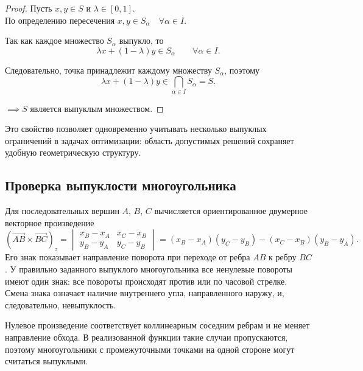 \begin{proof}
Пусть $x,y\in S$ и $\lambda\in[0,1]$.\\
По определению пересечения
$x,y\in S_\alpha \quad \forall \alpha\in I$.

Так как каждое множество $S_\alpha$ выпукло, то
\[
    \lambda x+(1-\lambda)y\in S_\alpha
    \qquad \forall \alpha\in I.
\]

Следовательно, точка принадлежит каждому множеству $S_\alpha$, поэтому
\[
    \lambda x+(1-\lambda)y
    \in \bigcap_{\alpha\in I} S_\alpha
    = S.
\]

$\implies S$ является выпуклым множеством.
\end{proof}

Это свойство позволяет одновременно учитывать несколько выпуклых ограничений в задачах оптимизации: область допустимых решений сохраняет удобную геометрическую структуру.

\subsection{Проверка выпуклости многоугольника}

Для последовательных вершин $A$, $B$, $C$ вычисляется ориентированное двумерное векторное произведение
\[
\left(\overrightarrow{AB}\times\overrightarrow{BC}\right)_z
=
\begin{vmatrix}
x_B-x_A & x_C-x_B\\
y_B-y_A & y_C-y_B
\end{vmatrix}
=
(x_B-x_A)(y_C-y_B)
-
(x_C-x_B)(y_B-y_A).
\]
Его знак показывает направление поворота при переходе от ребра $AB$ к
ребру $BC$. У правильно заданного выпуклого многоугольника все
ненулевые повороты имеют один знак: все повороты происходят против или
по часовой стрелке. Смена знака означает наличие
внутреннего угла, направленного наружу, и, следовательно,
невыпуклость.

Нулевое произведение соответствует коллинеарным соседним ребрам и не
меняет направление обхода. В реализованной функции такие случаи
пропускаются, поэтому многоугольники с промежуточными точками на одной
стороне могут считаться выпуклыми.
